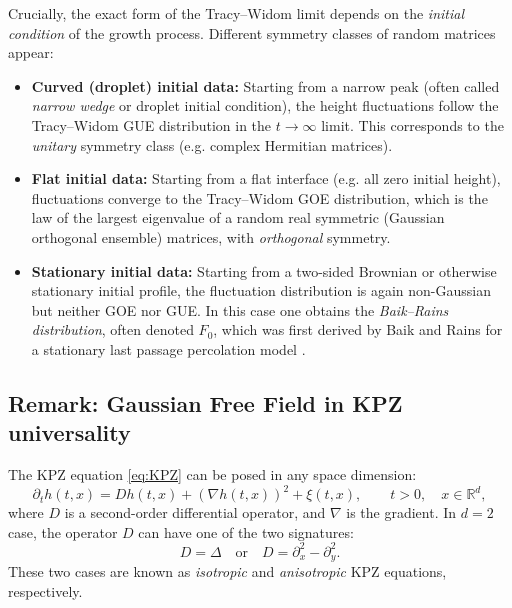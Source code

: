 \documentclass[letterpaper,11pt,oneside,reqno]{article}
\numberwithin{equation}{section}
\theoremstyle{definition}
\begin{document}
Crucially, the exact form of the Tracy--Widom limit depends on the \emph{initial condition} of the growth process. Different symmetry classes of random matrices appear:
\begin{itemize}
		\item \textbf{Curved (droplet) initial data:} Starting
			from a narrow peak (often called \emph{narrow wedge}
			or droplet initial condition), the height fluctuations
			follow the Tracy--Widom GUE distribution in the
			$t\to\infty$ limit. This
			corresponds to the \emph{unitary} symmetry
			class (e.g. complex Hermitian matrices).

		\item \textbf{Flat initial data:} Starting from a flat
			interface (e.g. all zero initial height), fluctuations
			converge to the Tracy--Widom GOE distribution,
			which is the law of the
			largest eigenvalue of a random real symmetric (Gaussian
			orthogonal ensemble) matrices, with \emph{orthogonal} symmetry.

		\item \textbf{Stationary initial data:} Starting from a
			two-sided Brownian or otherwise stationary initial
			profile, the fluctuation distribution is
			again non-Gaussian but neither GOE nor GUE. In this
			case one obtains the \emph{Baik--Rains distribution},
			often denoted $F_0$, which was first derived by Baik
			and Rains for a stationary last passage percolation
			model \cite{baik2000limiting_BR_distribution}.
\end{itemize}

\subsection{Remark: Gaussian Free Field in KPZ universality}

The KPZ equation \eqref{eq:KPZ} can be posed in any space dimension:
\begin{equation*}
	\partial_t h(t,x)= D h(t,x) + (\nabla h(t,x))^2 + \xi(t,x),
	\qquad t>0,\quad x\in\mathbb{R}^d,
\end{equation*}
where $D$ is a second-order differential operator, and $\nabla$ is the gradient.
In $d=2$ case, the operator $D$ can have one of the two signatures:
\begin{equation*}
	D=\Delta \quad \text{or} \quad D=\partial_x^2-\partial_y^2.
\end{equation*}
These two cases are known as \emph{isotropic} and \emph{anisotropic} KPZ equations, respectively.
\end{document}
